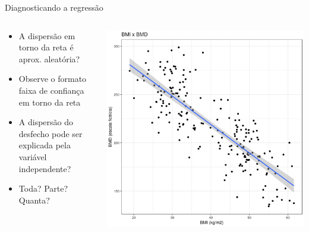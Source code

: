 \documentclass{beamer}
\begin{document}
\begin{frame}{\scriptsize Diagnosticando a regressão}
  \begin{columns}
    \begin{column}{5cm}
      \begin{itemize}
        \small
      \item \alert<2>{A dispersão em torno da reta é aprox. aleatória?}
        \bigskip
      \item Observe o formato faixa de confiança em torno da reta
        \bigskip
        \scriptsize
      \item A dispersão do desfecho pode ser explicada pela variável independente?
      \item Toda? Parte? Quanta?
      \end{itemize}
    \end{column}
    \begin{column}{5cm}
      \begin{center}
        \includegraphics[width=1.1\textwidth]{Cap18-19/pratica-rls2}
      \end{center}
    \end{column}
  \end{columns}
\end{frame}

\end{document}
